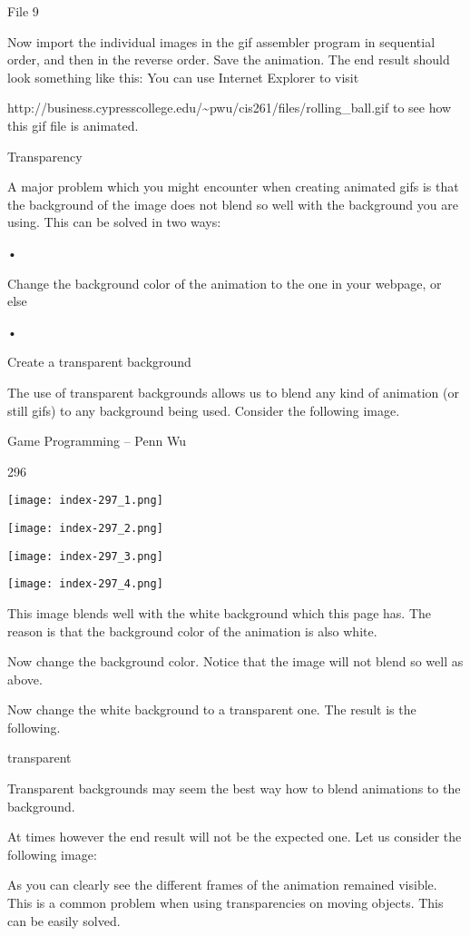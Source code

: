 \documentclass[
]{article}
\begin{document}
File 9

Now import the individual images in the gif assembler program in
sequential order, and then in the reverse order. Save the animation. The
end result should look something like this: You can use Internet
Explorer to visit

http://business.cypresscollege.edu/\textasciitilde pwu/cis261/files/rolling\_ball.gif
to see how this gif file is animated.

Transparency

A major problem which you might encounter when creating animated gifs is
that the background of the image does not blend so well with the
background you are using. This can be solved in two ways:

•

Change the background color of the animation to the one in your webpage,
or else

•

Create a transparent background

The use of transparent backgrounds allows us to blend any kind of
animation (or still gifs) to any background being used. Consider the
following image.

Game Programming -- Penn Wu

296

\protect\hypertarget{index_split_015.htmlux5cux23p297}{}{}\texttt{[image: index-297\_1.png]}

\texttt{[image: index-297\_2.png]}

\texttt{[image: index-297\_3.png]}

\texttt{[image: index-297\_4.png]}

This image blends well with the white background which this page has.
The reason is that the background color of the animation is also white.

Now change the background color. Notice that the image will not blend so
well as above.

Now change the white background to a transparent one. The result is the
following.

transparent

Transparent backgrounds may seem the best way how to blend animations to
the background.

At times however the end result will not be the expected one. Let us
consider the following image:

As you can clearly see the different frames of the animation remained
visible. This is a common problem when using transparencies on moving
objects. This can be easily solved.
\end{document}

